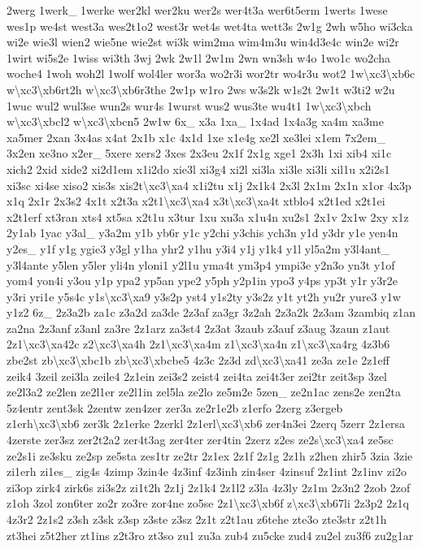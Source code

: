 \begin{DoxyCompactItemize}
2werg 1werk\-\_\- 1werke wer2kl wer2ku wer2s wer4t3a wer6t5erm 1werts 1wese wes1p we4st west3a wes2t1o2 west3r wet4s wet4ta wett3s 2w1g 2wh w5ho wi3cka wi2e wie3l wien2 wie5ne wie2st wi3k wim2ma wim4m3u win4d3e4c win2e wi2r 1wirt wi5s2e 1wiss wi3th 3wj 2wk 2w1l 2w1m 2wn wn3sh w4o 1wo1c wo2cha woche4 1woh woh2l 1wolf wol4ler wor3a wo2r3i wor2tr wo4r3u wot2 1w\textbackslash{}xc3\textbackslash{}xb6c w\textbackslash{}xc3\textbackslash{}xb6rt2h w\textbackslash{}xc3\textbackslash{}xb6r3the 2w1p w1ro 2ws w3s2k w1s2t 2w1t w3ti2 w2u 1wuc wul2 wul3se wun2s wur4s 1wurst wus2 wus3te wu4t1 1w\textbackslash{}xc3\textbackslash{}xbch w\textbackslash{}xc3\textbackslash{}xbcl2 w\textbackslash{}xc3\textbackslash{}xbcn5 2w1w 6x\-\_\- x3a 1xa\-\_\- 1x4ad 1x4a3g xa4m xa3me xa5mer 2xan 3x4as x4at 2x1b x1c 4x1d 1xe x1e4g xe2l xe3lei x1em 7x2em\-\_\- 3x2en xe3no x2er\-\_\- 5xere xers2 3xes 2x3eu 2x1f 2x1g xge1 2x3h 1xi xib4 xi1c xich2 2xid xide2 xi2d1em x1i2do xie3l xi3g4 xi2l xi3la xi3le xi3li xil1u x2i2s1 xi3sc xi4se xiso2 xis3s xis2t\textbackslash{}xc3\textbackslash{}xa4 x1i2tu x1j 2x1k4 2x3l 2x1m 2x1n x1or 4x3p x1q 2x1r 2x3s2 4x1t x2t3a x2t1\textbackslash{}xc3\textbackslash{}xa4 x3t\textbackslash{}xc3\textbackslash{}xa4t xtblo4 x2t1ed x2t1ei x2t1erf xt3ran xts4 xt5sa x2t1u x3tur 1xu xu3a x1u4n xu2s1 2x1v 2x1w 2xy x1z 2y1ab 1yac y3al\-\_\- y3a2m y1b yb6r y1c y2chi y3chis ych3n y1d y3dr y1e yen4n y2es\-\_\- y1f y1g ygie3 y3gl y1ha yhr2 y1hu y3i4 y1j y1k4 y1l yl5a2m y3l4ant\-\_\- y3l4ante y5len y5ler yli4n yloni1 y2l1u yma4t ym3p4 ympi3e y2n3o yn3t y1of yom4 yon4i y3ou y1p ypa2 yp5an ype2 y5ph y2p1in ypo3 y4ps yp3t y1r y3r2e y3ri yri1e y5s4c y1s\textbackslash{}xc3\textbackslash{}xa9 y3s2p yst4 y1s2ty y3s2z y1t yt2h yu2r yure3 y1w y1z2 6z\-\_\- 2z3a2b za1c z3a2d za3de 2z3af za3gr 3z2ah 2z3a2k 2z3am 3zambiq z1an za2na 2z3anf z3anl za3re 2z1arz za3st4 2z3at 3zaub z3auf z3aug 3zaun z1aut 2z1\textbackslash{}xc3\textbackslash{}xa42c z2\textbackslash{}xc3\textbackslash{}xa4h 2z1\textbackslash{}xc3\textbackslash{}xa4m z1\textbackslash{}xc3\textbackslash{}xa4n z1\textbackslash{}xc3\textbackslash{}xa4rg 4z3b6 zbe2st zb\textbackslash{}xc3\textbackslash{}xbc1b zb\textbackslash{}xc3\textbackslash{}xbcbe5 4z3c 2z3d zd\textbackslash{}xc3\textbackslash{}xa41 ze3a ze1e 2z1eff zeik4 3zeil zei3la zeile4 2z1ein zei3s2 zeist4 zei4ta zei4t3er zei2tr zeit3sp 3zel ze2l3a2 ze2len ze2l1er ze2l1in zel5la ze2lo ze5m2e 5zen\-\_\- ze2n1ac zens2e zen2ta 5z4entr zent3sk 2zentw zen4zer zer3a ze2r1e2b z1erfo 2zerg z3ergeb z1erh\textbackslash{}xc3\textbackslash{}xb6 zer3k 2z1erke 2zerkl 2z1erl\textbackslash{}xc3\textbackslash{}xb6 zer4n3ei 2zerq 5zerr 2z1ersa 4zerste zer3sz zer2t2a2 zer4t3ag zer4ter zer4tin 2zerz z2es ze2s\textbackslash{}xc3\textbackslash{}xa4 ze5sc ze2s1i ze3sku ze2sp ze5sta zes1tr ze2tr 2z1ex 2z1f 2z1g 2z1h z2hen zhir5 3zia 3zie zi1erh zi1es\-\_\- zig4s 4zimp 3zin4e 4z3inf 4z3inh zin4ser 4zinsuf 2z1int 2z1inv zi2o zi3op zirk4 zirk6s zi3s2z zi1t2h 2z1j 2z1k4 2z1l2 z3la 4z3ly 2z1m 2z3n2 2zob 2zof z1oh 3zol zon6ter zo2r zo3re zor4ne zo5se 2z1\textbackslash{}xc3\textbackslash{}xb6f z\textbackslash{}xc3\textbackslash{}xb67li 2z3p2 2z1q 4z3r2 2z1s2 z3sh z3sk z3sp z3ste z3sz 2z1t z2t1au z6tehe zte3o zte3str z2t1h zt3hei z5t2her zt1ins z2t3ro zt3so zu1 zu3a zub4 zu5cke zud4 zu2el zu3f6 zu2g1ar 
\end{DoxyCompactItemize}

